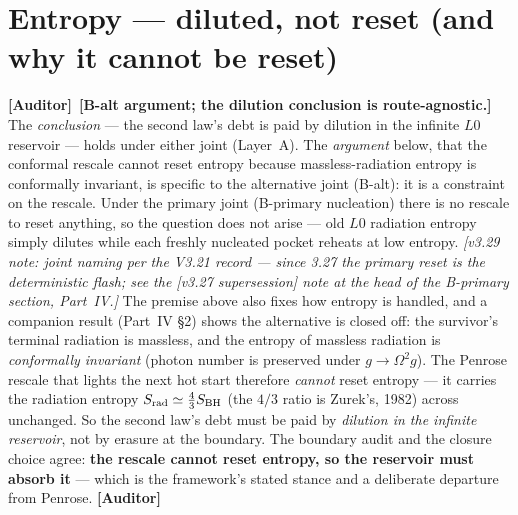 \documentclass[11pt]{article}
\newcommand{\Auditor}{\textbf{\textcolor{teal!55!black}{[Auditor]}}}
\begin{document}
\section{Entropy --- diluted, not reset (and why it cannot be reset)}
\noindent\Auditor\ \textbf{[B-alt argument; the dilution conclusion is route-agnostic.]} The \emph{conclusion} --- the second law's debt is paid by dilution in the infinite $L0$ reservoir --- holds under either joint (Layer~A). The \emph{argument} below, that the conformal rescale cannot reset entropy because massless-radiation entropy is conformally invariant, is specific to the alternative joint (B-alt): it is a constraint on the rescale. Under the primary joint (B-primary nucleation) there is no rescale to reset anything, so the question does not arise --- old $L0$ radiation entropy simply dilutes while each freshly nucleated pocket reheats at low entropy. \emph{[v3.29 note: joint naming per the V3.21 record --- since 3.27 the primary reset is the deterministic flash; see the [v3.27 supersession] note at the head of the B-primary section, Part~IV.]}
The premise above also fixes how entropy is handled, and a companion result (Part~IV \S2) shows the alternative is closed off: the survivor's terminal radiation is massless, and the entropy of massless radiation is \emph{conformally invariant} (photon number is preserved under $g\!\to\!\Omega^2 g$). The Penrose rescale that lights the next hot start therefore \emph{cannot} reset entropy --- it carries the radiation entropy $S_{\rm rad}\simeq\tfrac43 S_{\rm BH}$ (the $4/3$ ratio is Zurek's, 1982) across unchanged. So the second law's debt must be paid by \emph{dilution in the infinite reservoir}, not by erasure at the boundary. The boundary audit and the closure choice agree: \textbf{the rescale cannot reset entropy, so the reservoir must absorb it} --- which is the framework's stated stance and a deliberate departure from Penrose. \Auditor

\end{document}
